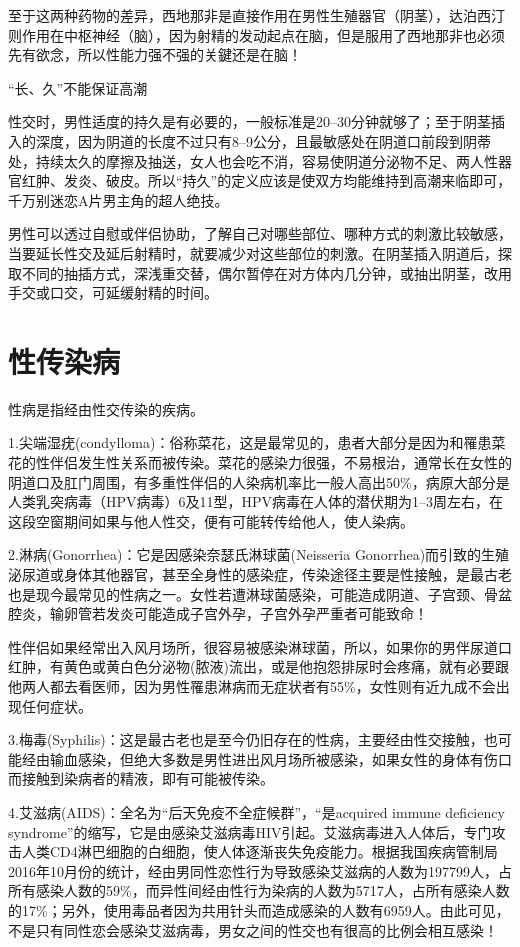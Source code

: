 \documentclass[12pt,UTF8]{ctexbook}
\begin{document}
至于这两种药物的差异，西地那非是直接作用在男性生殖器官（阴茎），达泊西汀则作用在中枢神经（脑），因为射精的发动起点在脑，但是服用了西地那非也必须先有欲念，所以性能力强不强的关鍵还是在脑！

“长、久”不能保证高潮

性交时，男性适度的持久是有必要的，一般标准是20--30分钟就够了；至于阴茎插入的深度，因为阴道的长度不过只有8--9公分，且最敏感处在阴道口前段到阴蒂处，持续太久的摩擦及抽送，女人也会吃不消，容易使阴道分泌物不足、两人性器官红肿、发炎、破皮。所以“持久”的定义应该是使双方均能维持到高潮来临即可，千万别迷恋A片男主角的超人绝技。

男性可以透过自慰或伴侣协助，了解自己对哪些部位、哪种方式的刺激比较敏感，当要延长性交及延后射精时，就要减少对这些部位的刺激。在阴茎插入阴道后，探取不同的抽插方式，深浅重交替，偶尔暂停在对方体内几分钟，或抽出阴茎，改用手交或口交，可延缓射精的时间。

\part{性传染病}

性病是指经由性交传染的疾病。

1.尖端湿疣(condylloma)：俗称菜花，这是最常见的，患者大部分是因为和罹患菜花的性伴侣发生性关系而被传染。菜花的感染力很强，不易根治，通常长在女性的阴道口及肛门周围，有多重性伴侣的人染病机率比一般人高出50\%，病原大部分是人类乳突病毒（HPV病毒）6及11型，HPV病毒在人体的潜伏期为1--3周左右，在这段空窗期间如果与他人性交，便有可能转传给他人，使人染病。

2.淋病(Gonorrhea)：它是因感染奈瑟氏淋球菌(Neisseria Gonorrhea)而引致的生殖泌尿道或身体其他器官，甚至全身性的感染症，传染途径主要是性接触，是最古老也是现今最常见的性病之一。女性若遭淋球菌感染，可能造成阴道、子宫颈、骨盆腔炎，输卵管若发炎可能造成子宫外孕，子宫外孕严重者可能致命！

性伴侣如果经常出入风月场所，很容易被感染淋球菌，所以，如果你的男伴尿道口红肿，有黄色或黄白色分泌物(脓液)流出，或是他抱怨排尿时会疼痛，就有必要跟他两人都去看医师，因为男性罹患淋病而无症状者有55\%，女性则有近九成不会出现任何症状。

3.梅毒(Syphilis)：这是最古老也是至今仍旧存在的性病，主要经由性交接触，也可能经由输血感染，但绝大多数是男性进出风月场所被感染，如果女性的身体有伤口而接触到染病者的精液，即有可能被传染。

4.艾滋病(AIDS)：全名为“后天免疫不全症候群”，“是acquired immune deficiency syndrome”的缩写，它是由感染艾滋病毒HIV引起。艾滋病毒进入人体后，专门攻击人类CD4淋巴细胞的白细胞，使人体逐渐丧失免疫能力。根据我国疾病管制局2016年10月份的统计，经由男同性恋性行为导致感染艾滋病的人数为197799人，占所有感染人数的59\%，而异性间经由性行为染病的人数为5717人，占所有感染人数的17\%；另外，使用毒品者因为共用针头而造成感染的人数有6959人。由此可见，不是只有同性恋会感染艾滋病毒，男女之间的性交也有很高的比例会相互感染！
\end{document}
